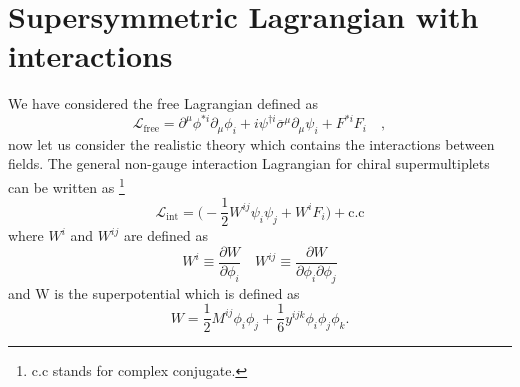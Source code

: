 \documentclass[12pt]{report}
\begin{document}
\section{Supersymmetric Lagrangian with interactions}
We have considered the free Lagrangian defined as
\begin{equation} \label{eq: free Lagrangian}
\mathcal{L}_{\mathrm{free}} = \partial^{\mu} \phi^{*i} \partial_{\mu} \phi_{i} + i \psi^{\dag i} \overline{\sigma}^{\mu} \partial_{\mu} \psi_{i} + F^{*i} F_{i} \quad,
\end{equation}
now let us consider the realistic theory which contains the interactions between fields.
The general non-gauge interaction Lagrangian for chiral supermultiplets can be written as \footnote{c.c stands for complex conjugate.}
\begin{equation} \label{eq: non-gauge interaction Lagrangian}
\mathcal{L}_{\mathrm{int}} = \Big( - \frac{1}{2} W^{ij} \psi_{i} \psi_{j} + W^{i} F_{i}\Big) + \mathrm{c.c}
\end{equation}
where $W^{i}$ and $W^{ij}$ are defined as
\begin{equation}
W^{i} \equiv \frac{\partial W}{\partial \phi_{i}}%
\quad
W^{ij} \equiv \frac{\partial W}{\partial \phi_{i} \partial \phi_{j}}
\end{equation}
and W is the superpotential which is defined as
\begin{equation}
W = \frac{1}{2} M^{ij} \phi_{i} \phi_{j} + \frac{1}{6} y^{ijk} \phi_{i} \phi_{j} \phi_{k} .
\end{equation}
\end{document}
